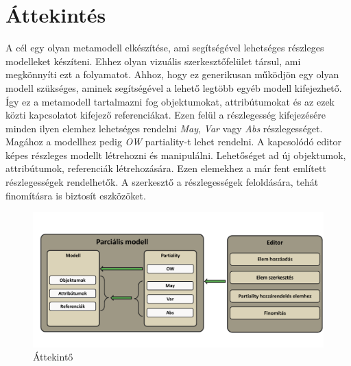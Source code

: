 \chapter{Áttekintés}


A cél egy olyan metamodell elkészítése, ami segítségével lehetséges részleges modelleket készíteni. Ehhez olyan vizuális szerkesztőfelület társul, ami megkönnyíti ezt a folyamatot. Ahhoz, hogy ez generikusan működjön egy olyan modell szükséges, aminek segítségével a lehető legtöbb egyéb modell kifejezhető. Így ez a metamodell tartalmazni fog objektumokat, attribútumokat és az ezek közti kapcsolatot kifejező referenciákat. Ezen felül a részlegesség kifejezésére minden ilyen elemhez lehetséges rendelni \textit{May}, \textit{Var} vagy \textit{Abs} részlegességet. Magához a modellhez pedig \textit{OW} partiality-t lehet rendelni.
A kapcsolódó editor képes részleges modellt létrehozni és manipulálni. Lehetőséget ad új objektumok, attribútumok, referenciák létrehozására. Ezen elemekhez a már fent említett részlegességek rendelhetők. A szerkesztő a részlegességek feloldására, tehát finomításra is biztosít eszközöket.



\begin{figure}[!ht]
	\includegraphics[width=150mm]{figures/overview.pdf}
	\caption{Áttekintő} 
\end{figure}

